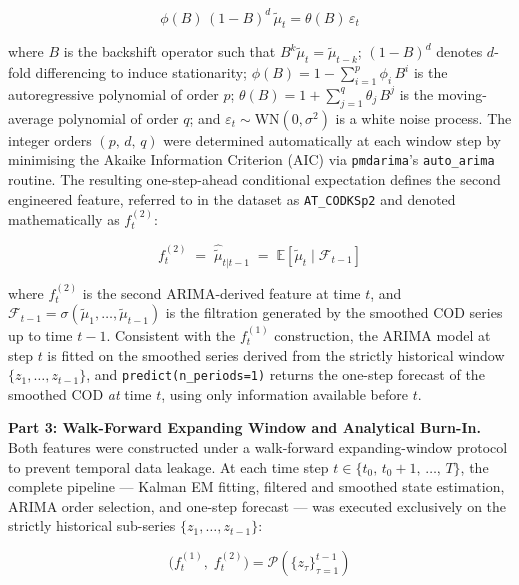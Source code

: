 \documentclass[conference]{IEEEtran}
\begin{document}
\begin{equation}
    \phi(B)\,(1-B)^d\,\tilde{\mu}_t = \theta(B)\,\varepsilon_t
    \label{eq:arima}
\end{equation}

where $B$ is the backshift operator such that $B^k\tilde{\mu}_t = \tilde{\mu}_{t-k}$; $(1-B)^d$ denotes $d$-fold differencing to induce stationarity; $\phi(B) = 1 - \sum_{i=1}^{p}\phi_i\,B^i$ is the autoregressive polynomial of order $p$; $\theta(B) = 1 + \sum_{j=1}^{q}\theta_j\,B^j$ is the moving-average polynomial of order $q$; and $\varepsilon_t \sim \mathrm{WN}(0,\sigma^2)$ is a white noise process. The integer orders $(p,\,d,\,q)$ were determined automatically at each window step by minimising the Akaike Information Criterion (AIC) via \texttt{pmdarima}'s \texttt{auto\_arima} routine. The resulting one-step-ahead conditional expectation defines the second engineered feature, referred to in the dataset as \texttt{AT\_CODKSp2} and denoted mathematically as $f^{(2)}_t$:

\begin{equation}
    f^{(2)}_t \;=\; \hat{\tilde{\mu}}_{t|t-1} \;=\; \mathbb{E}\!\left[\tilde{\mu}_{t} \mid \mathcal{F}_{t-1}\right]
    \label{eq:ksp2}
\end{equation}

where $f^{(2)}_t$ is the second ARIMA-derived feature at time $t$, and $\mathcal{F}_{t-1} = \sigma(\tilde{\mu}_1, \ldots, \tilde{\mu}_{t-1})$ is the filtration generated by the smoothed COD series up to time $t-1$. Consistent with the $f^{(1)}_t$ construction, the ARIMA model at step $t$ is fitted on the smoothed series derived from the strictly historical window $\{z_1,\ldots,z_{t-1}\}$, and \texttt{predict(n\_periods=1)} returns the one-step forecast of the smoothed COD \emph{at} time $t$, using only information available before $t$.

\textbf{Part 3: Walk-Forward Expanding Window and Analytical Burn-In.}
Both features were constructed under a walk-forward expanding-window protocol to prevent temporal data leakage. At each time step $t \in \{t_0,\, t_0\!+\!1,\, \ldots,\, T\}$, the complete pipeline --- Kalman EM fitting, filtered and smoothed state estimation, ARIMA order selection, and one-step forecast --- was executed exclusively on the strictly historical sub-series $\{z_1, \ldots, z_{t-1}\}$:

\begin{equation}
    \bigl(f^{(1)}_t,\; f^{(2)}_t\bigr) = \mathcal{P}\!\left(\{z_\tau\}_{\tau=1}^{t-1}\right)
    \label{eq:pipeline}
\end{equation}
\end{document}
